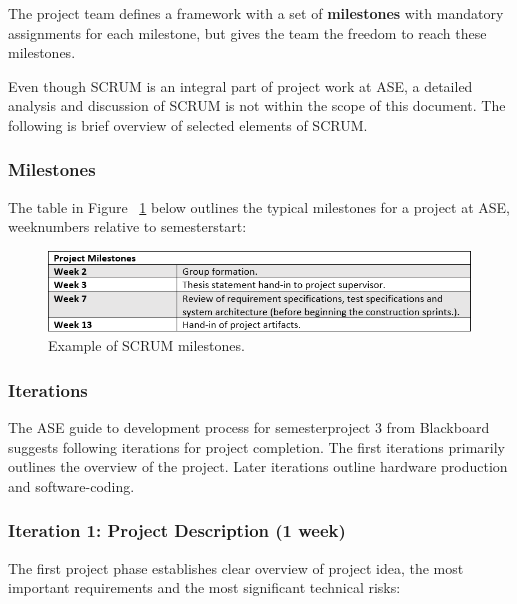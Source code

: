 The project team defines a framework with a set of \textbf{milestones} with mandatory assignments for each milestone, but gives the team the freedom to reach these milestones. \newline

Even though SCRUM is an integral part of project work at ASE, a detailed analysis and discussion of SCRUM is not within the scope of this document. The following is brief overview of selected elements of SCRUM. \newline

\subsubsection{Milestones}
The table in Figure ~\ref{fig:milestonespng} below outlines the typical milestones for a project at ASE, weeknumbers relative to semesterstart:

\begin{figure}[H]
\centering
\includegraphics[scale=0.8]{./pictures/milestones.png}
\caption{Example of SCRUM milestones.}
\label{fig:milestonespng}
\end{figure}

\subsubsection{Iterations}
The ASE guide to development process for semesterproject 3 from Blackboard suggests following iterations for project completion. The first iterations primarily outlines the overview of the project. Later iterations outline hardware production and software-coding. \\

\subsubsection{Iteration 1: Project Description (1 week)}
The first project phase establishes clear overview of project idea, the most important requirements and the most significant technical risks: \newline 

